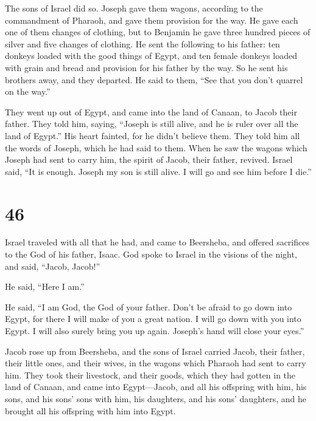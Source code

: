  The sons of Israel did so. Joseph gave them wagons,
according to the commandment of Pharaoh, and gave them provision for the
way.  He gave each one of them changes of clothing, but
to Benjamin he gave three hundred pieces of silver and five changes of
clothing.  He sent the following to his father: ten
donkeys loaded with the good things of Egypt, and ten female donkeys
loaded with grain and bread and provision for his father by the way.
 So he sent his brothers away, and they departed. He said
to them, ``See that you don't quarrel on the way.''

 They went up out of Egypt, and came into the land of
Canaan, to Jacob their father.  They told him, saying,
``Joseph is still alive, and he is ruler over all the land of Egypt.''
His heart fainted, for he didn't believe them.  They told
him all the words of Joseph, which he had said to them. When he saw the
wagons which Joseph had sent to carry him, the spirit of Jacob, their
father, revived.  Israel said, ``It is enough. Joseph my
son is still alive. I will go and see him before I die.''

\hypertarget{section-45}{%
\section{46}\label{section-45}}

 Israel traveled with all that he had, and came to
Beersheba, and offered sacrifices to the God of his father, Isaac.
 God spoke to Israel in the visions of the night, and
said, ``Jacob, Jacob!''

He said, ``Here I am.''

 He said, ``I am God, the God of your father. Don't be
afraid to go down into Egypt, for there I will make of you a great
nation.  I will go down with you into Egypt. I will also
surely bring you up again. Joseph's hand will close your eyes.''

 Jacob rose up from Beersheba, and the sons of Israel
carried Jacob, their father, their little ones, and their wives, in the
wagons which Pharaoh had sent to carry him.  They took
their livestock, and their goods, which they had gotten in the land of
Canaan, and came into Egypt---Jacob, and all his offspring with him,
 his sons, and his sons' sons with him, his daughters, and
his sons' daughters, and he brought all his offspring with him into
Egypt.

